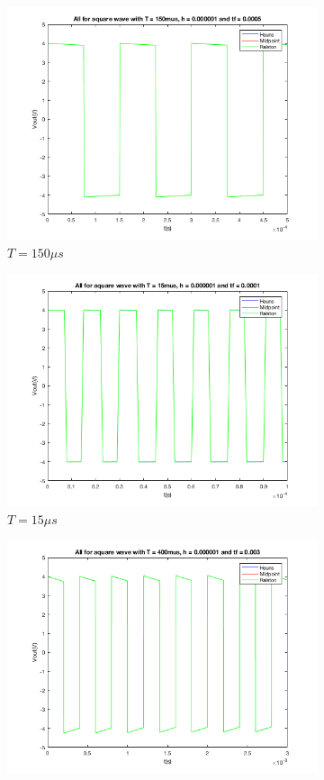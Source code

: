 \documentclass[11pt,a4paper]{article}
\begin{document}
    \begin{figure}[h]
        \begin{subfigure}{.5\textwidth}
          \centering
          \includegraphics[width=.8\linewidth]{Ex1_Figs/square150.png}
          \caption{$T = 150\mu s$}
          \label{fig:sfig5}
        \end{subfigure}%
        \begin{subfigure}{.5\textwidth}
          \centering
          \includegraphics[width=.8\linewidth]{Ex1_Figs/square15.png}
          \caption{$T = 15\mu s$}
          \label{fig:sfig6}
        \end{subfigure}
        \begin{subfigure}{.5\textwidth}
          \centering
          \includegraphics[width=.8\linewidth]{Ex1_Figs/square400.png}

\end{subfigure}
\end{figure}
\end{document}
